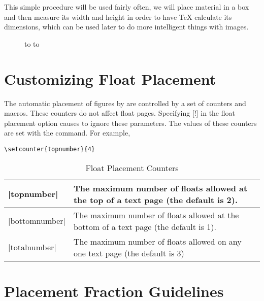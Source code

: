 This simple procedure will be used fairly often, we will place material in a box and then measure its width and height in order to have TeX calculate its dimensions, which can be used later to do more intelligent things with images. 

\begin{figure}[tb]
\ifoddpage
  \hbox to %
\else
  \hbox to %
\fi
\end{figure}


\section{Customizing Float Placement}

The automatic placement of figures by \latexe are controlled by a set of counters and macros. These counters do not affect float pages. Specifying [!] in the float placement option causes \latex to ignore these parameters. The values of these counters are set with the  command. For example,

\begin{verbatim}
\setcounter{topnumber}{4}
\end{verbatim}

\begin{table}[htbp]
\caption{Float Placement Counters}
\centering

\begin{tabularx}{0.8\textwidth}{|l|X|}
\hline
|topnumber| & The maximum number of floats allowed at the top of a text page (the default is 2).\\
\hline
|bottomnumber| &The maximum number of floats allowed at the bottom of a text
page (the default is 1).\\
\hline
|totalnumber| &The maximum number of floats allowed on any one text page
(the default is 3)\\
\hline
\end{tabularx}\par

\end{table}


\section{Placement Fraction Guidelines}

